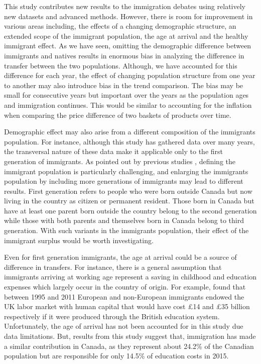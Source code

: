 This study contributes new results to the immigration debates using relatively new datasets and advanced methods.
However, there is room for improvement in various areas including, the effects of a changing demographic structure, an extended scope of the immigrant population, the age at arrival and the healthy immigrant effect.
As we have seen, omitting the demographic difference between immigrants and natives results in enormous bias in analyzing the difference in transfer between the two populations.
Although, we have accounted for this difference for each year, the effect of changing population structure from one year to another may also introduce bias in the trend comparison.
The bias may be small for consecutive years but important over the years as the population ages and immigration continues.
This would be similar to accounting for the inflation when comparing the price difference of two baskets of products over time.

\vspace{0.7em}\par
Demographic effect may also arise from a different composition of the immigrants population.
For instance, although this study has gathered data over many years, the transversal nature of these data make it applicable only to the first generation of immigrants.
As pointed out by previous studies \citep{Lee:1998fs}, defining the immigrant population is particularly challenging, and enlarging the immigrants population by including more generations of immigrants may lead to different results.
First generation refers to people who were born outside Canada but now living in the country as citizen or permanent resident.
Those born in Canada but have at least one parent born outside the country belong to the second generation while those with both parents and themselves born in Canada belong to third generation.
With such variants in the immigrants population, their effect of the immigrant surplus would be worth investigating.

\vspace{0.7em}\par
Even for first generation immigrants, the age at arrival could be a source of difference in transfers.
For instance, there is a general assumption that immigrants arriving at working age represent a saving in childhood and education expenses which largely occur in the country of origin.
For example, \citet{Dustmann:2014dr} found that between 1995 and 2011 European and non-European immigrants endowed the UK labor market with human capital that would have cost \pounds14 and \pounds35 billion respectively if it were produced through the British education system.
Unfortunately, the age of arrival has not been accounted for in this study due data limitations.
But, results from this study suggest that, immigration has made a similar contribution in Canada, as they represent about 24.2\% of the Canadian population but are responsible for only 14.5\% of education costs in 2015.


